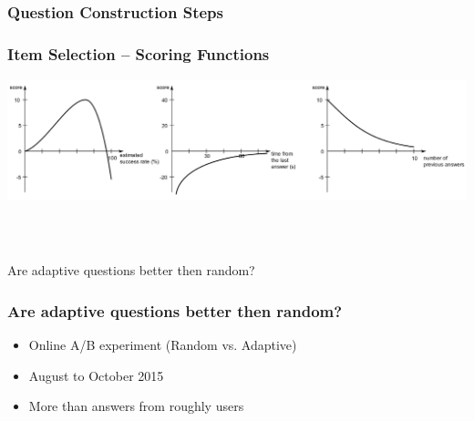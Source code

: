 \documentclass[xcolor=svgnames]{beamer}
\begin{document}
\begin{frame}
	\frametitle{Question Construction Steps}
\end{frame}
\begin{frame}
	\frametitle{Item Selection – Scoring Functions}
   \includegraphics[width=\textwidth]{img/3functions.png}
\end{frame}
\begin{frame}
  \frametitle{~}
\begin{center} 
\huge{Are adaptive questions better then random?}
\end{center}
\end{frame}
\begin{frame}
	\frametitle{Are adaptive questions better then random?}
  \begin{itemize}
    \item Online A/B experiment (Random vs. Adaptive)
    \item August to October 2015
    \item More than  answers from roughly  users
    \
  \end{itemize}
\end{frame}
\end{document}
